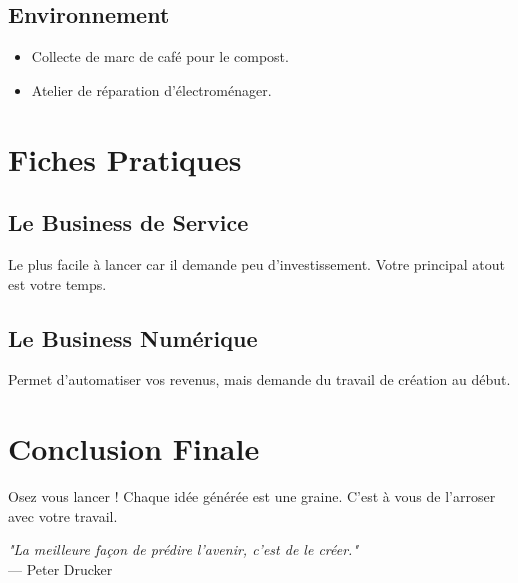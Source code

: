 \documentclass[12pt,a4paper]{report}
\begin{document}
\section*{Environnement}
\begin{itemize}
    \item Collecte de marc de café pour le compost.
    \item Atelier de réparation d'électroménager.
\end{itemize}

\newpage

\chapter*{Fiches Pratiques}
\section*{Le Business de Service}
Le plus facile à lancer car il demande peu d'investissement. Votre principal atout est votre temps.

\section*{Le Business Numérique}
Permet d'automatiser vos revenus, mais demande du travail de création au début.

\newpage

\chapter*{Conclusion Finale}
Osez vous lancer ! Chaque idée générée est une graine. C'est à vous de l'arroser avec votre travail.

\vspace{2cm}
\begin{center}
    \textit{"La meilleure façon de prédire l'avenir, c'est de le créer."}\\
    --- Peter Drucker
\end{center}
\end{document}
